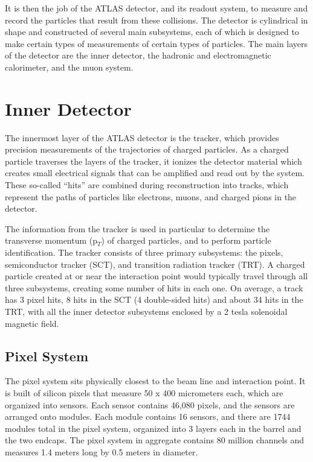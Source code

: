 It is then the job of the ATLAS detector, and its readout system, to measure and record the particles that result from these collisions.  The detector is cylindrical in shape and constructed of several main subsystems, each of which is designed to make certain types of measurements of certain types of particles.  The main layers of the detector are the inner detector, the hadronic and electromagnetic calorimeter, and the muon system.



\section{Inner Detector}
The innermost layer of the ATLAS detector is the tracker, which provides precision measurements of the trajectories of charged particles.  As a charged particle traverses the layers of the tracker, it ionizes the detector material which creates small electrical signals that can be amplified and read out by the system.  These so-called ``hits'' are combined during reconstruction into tracks, which represent the paths of particles like electrons, muons, and charged pions in the detector.

The information from the tracker is used in particular to determine the transverse momentum (p$_T$) of charged particles, and to perform particle identification.  The tracker consists of three primary subsystems: the pixels, semiconductor tracker (SCT), and transition radiation tracker (TRT).  A charged particle created at or near the interaction point would typically travel through all three subsystems, creating some number of hits in each one.  On average, a track has 3 pixel hits, 8 hits in the SCT (4 double-sided hits) and about 34 hits in the TRT, with all the inner detector subsystems enclosed by a 2 tesla solenoidal magnetic field. 

\subsection{Pixel System}
The pixel system sits physically closest to the beam line and interaction point.  It is built of silicon pixels that measure 50 x 400 micrometers each, which are organized into sensors.  Each sensor contains 46,080 pixels, and the sensors are arranged onto modules.  Each module contains 16 sensors, and there are 1744 modules total in the pixel system, organized into 3 layers each in the barrel and the two endcaps.  The pixel system in aggregate contains 80 million channels and measures 1.4 meters long by 0.5 meters in diameter.

